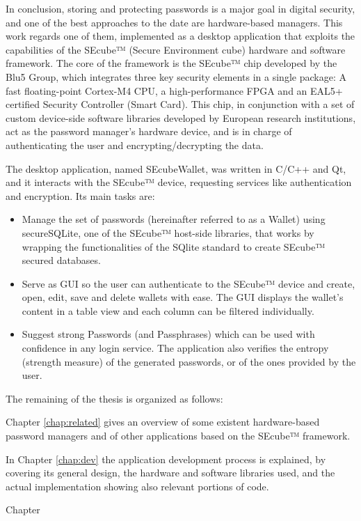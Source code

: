 \vspace{10pt}
In conclusion, storing and protecting passwords is a major goal in digital security, and one of the best approaches to the date are hardware-based managers. This work regards one of them, implemented as a desktop application that exploits the capabilities of the SEcube™ (Secure Environment cube) hardware and software framework. The core of the framework is the SEcube™ chip developed by the Blu5 Group\citep{Blu5}, which integrates three key security elements in a single package: A fast floating-point Cortex-M4 CPU, a high-performance FPGA and an EAL5+ certified Security Controller (Smart Card). This chip, in conjunction with a set of custom device-side software libraries\cite{SEcubeRes} developed by European research institutions, act as the password manager's hardware device, and is in charge of authenticating the user and encrypting/decrypting the data.

The desktop application, named SEcubeWallet, was written in C/C++ and Qt, and it interacts with the SEcube™ device, requesting services like authentication and encryption. Its main tasks are:
\begin{itemize}
\setlength\itemsep{-3pt}
\item Manage the set of passwords (hereinafter referred to as a Wallet) using secureSQLite, one of the SEcube™ host-side libraries, that works by wrapping the functionalities of the SQlite standard to create SEcube™ secured databases.
\item Serve as GUI so the user can authenticate to the SEcube™ device and create, open, edit, save and delete wallets with ease. The GUI displays the wallet's content in a table view and each column can be filtered individually.
\item Suggest strong Passwords (and Passphrases) which can be used with confidence in any login service. The application also verifies the entropy (strength measure) of the generated passwords, or of the ones provided by the user.
\end{itemize}

\newpage

The remaining of the thesis is organized as follows: 

Chapter \ref{chap:related} gives an overview of some existent hardware-based password managers and of other applications based on the SEcube™ framework. 

In Chapter \ref{chap:dev} the application development process is explained, by covering its general design, the hardware and software libraries used, and the actual implementation showing also relevant portions of code. 

Chapter 



